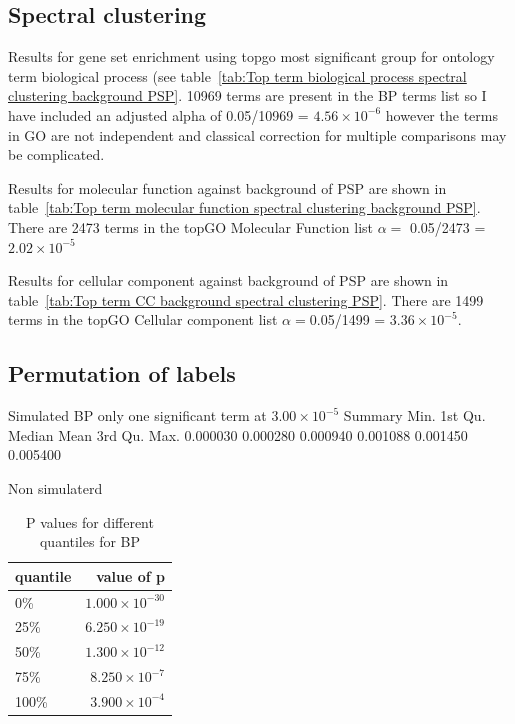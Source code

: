 \subsection{Spectral clustering}

Results for gene set enrichment using topgo most significant group for ontology term biological process (see table~\ref{tab:Top term biological process spectral clustering background PSP}. 10969 terms are present in the BP terms list so I have included an adjusted alpha of 0.05/10969 = $4.56 \times 10^{-6}$ however the terms in GO are not independent and classical correction for multiple comparisons may be complicated. 

Results for molecular function against background of PSP are shown in table~\ref{tab:Top term molecular function spectral clustering background PSP}. There are 2473 terms in the topGO Molecular Function list $\alpha=$ 0.05/2473 = $2.02 \times 10^{-5}$

Results for cellular component against background of PSP are shown in table~\ref{tab:Top term CC background spectral clustering PSP}. There are 1499 terms in the topGO Cellular component list $\alpha=$0.05/1499 = $3.36 \times 10^{-5}$.


\subsection{Permutation of labels}
Simulated 
BP only one significant term at $3.00 \times 10^{-5}$
Summary
   Min.  1st Qu.   Median     Mean  3rd Qu.     Max. 
0.000030 0.000280 0.000940 0.001088 0.001450 0.005400 

Non simulaterd
\begin{table}[ht]
\centering
\begin{tabular}{lr}
  \hline
quantile & value of p \\ 
  \hline
0\% & $1.000 \times 10^{-30}$ \\ 
  25\% & $6.250 \times 10^{-19}$ \\ 
  50\% & $1.300 \times 10^{-12}$ \\ 
  75\% & $8.250 \times 10^{-7}$ \\ 
  100\% & $3.900 \times 10^{-4}$ \\ 
   \hline
\end{tabular}
\caption{P values for different quantiles for BP} 
\label{tabP values for different quantiles for BP}
\end{table}

